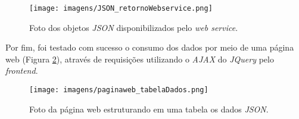 \begin{figure}[!ht]
\centering
\caption{Foto dos objetos \textit{JSON} disponibilizados pelo \textit{web service}.} 
{\texttt{[image: imagens/JSON\_retornoWebservice.png]}}\\
 \label{Fig:json_retorno_web}
\end{figure}

Por fim, foi testado com sucesso o consumo dos dados por meio de uma página web (Figura \ref{Fig:pagina_web_tabela_dados}), através de requisições utilizando o \textit{AJAX} do \textit{JQuery} pelo \textit{frontend}.

\begin{figure}[!ht]
\centering
\caption{Foto da página web estruturando em uma tabela os dados \textit{JSON}.} 
{\texttt{[image: imagens/paginaweb\_tabelaDados.png]}}\\
 \label{Fig:pagina_web_tabela_dados}
\end{figure}